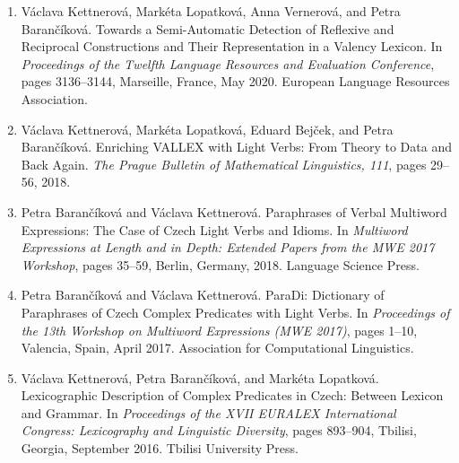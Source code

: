 \documentclass[12pt,a4paper]{report}
\begin{document}
\begin{enumerate}
  \setlength{\itemsep}{0pt}
  \setlength{\parsep}{0pt}
    \item Václava Kettnerová, Markéta Lopatková, Anna Vernerová, and Petra Barančíková. Towards a Semi-Automatic Detection of Reflexive and Reciprocal Constructions and Their Representation in a Valency Lexicon. In \emph{Proceedings of the Twelfth Language Resources and Evaluation Conference}, pages 3136--3144, Marseille, France, May 2020. European Language Resources Association.

    \item Václava Kettnerová, Markéta Lopatková, Eduard Bejček, and Petra Barančíková. Enriching VALLEX with Light Verbs: From Theory to Data and Back Again. \emph{The Prague Bulletin of Mathematical Linguistics, 111}, pages 29--56, 2018.

    \item Petra Barančíková and Václava Kettnerová. Paraphrases of Verbal Multiword Expressions: The Case of Czech Light Verbs and Idioms. In \emph{Multiword Expressions at Length and in Depth: Extended Papers from the MWE 2017 Workshop}, pages 35--59, Berlin, Germany, 2018. Language Science Press.

    \item Petra Barančíková and Václava Kettnerová. ParaDi: Dictionary of Paraphrases of Czech Complex Predicates with Light Verbs. In \emph{Proceedings of the 13th Workshop on Multiword Expressions (MWE 2017)}, pages 1--10, Valencia, Spain, April 2017. Association for Computational Linguistics.

    \item Václava Kettnerová, Petra Barančíková, and Markéta Lopatková. Lexicographic Description of Complex Predicates in Czech: Between Lexicon and Grammar. In \emph{Proceedings of the XVII EURALEX International Congress: Lexicography and Linguistic Diversity}, pages 893--904, Tbilisi, Georgia, September 2016. Tbilisi University Press.
\end{enumerate}
  \endgroup
\end{document}
